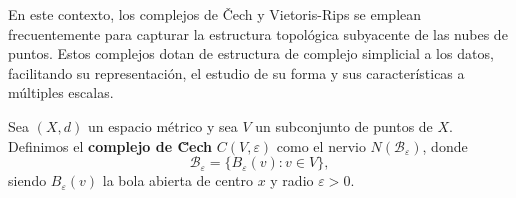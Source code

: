 En este contexto, los complejos de Čech y Vietoris-Rips se emplean frecuentemente para capturar la estructura topológica subyacente de las nubes de puntos. Estos complejos dotan de estructura de complejo simplicial a los datos, facilitando su representación, el estudio de su forma y sus características a múltiples escalas.
%
%

\begin{definicion}
	Sea \((X,d)\) un espacio métrico y sea \(V\) un subconjunto de puntos de \(X\). Definimos el \textbf{complejo de \u Cech} \(C(V, \varepsilon)\) como el nervio \(N(\mathcal{B}_\varepsilon)\), donde
	\[
		\mathcal{B}_\varepsilon = \{ B_{\varepsilon}(v) : v \in V \},
	\]
	siendo \(B_{\varepsilon}(v)\) la bola abierta de centro \(x\) y radio \(\varepsilon > 0\).
\end{definicion}


